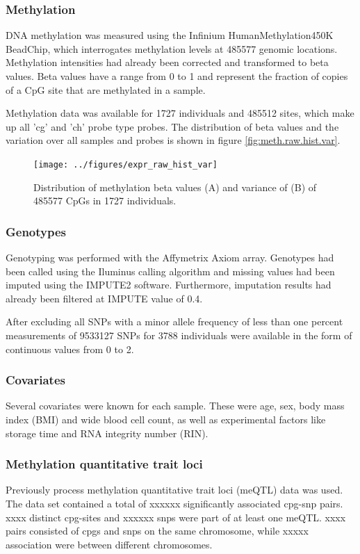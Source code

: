 \documentclass[a4paper,12pt]{article}
\begin{document}
\subsubsection{Methylation}
DNA methylation was measured using the Infinium HumanMethylation450K BeadChip, which interrogates methylation levels at 485577 genomic locations. Methylation intensities had already been corrected and transformed to beta values. Beta values have a range from 0 to 1 and represent the fraction of copies of a CpG site that are methylated in a sample.

Methylation data was available for 1727 individuals and 485512 sites, which make up all 'cg' and 'ch' probe type probes. The distribution of beta values and the variation over all samples and probes is shown in figure \ref{fig:meth.raw.hist.var}.

\begin{figure}[tb]
	\texttt{[image: ../figures/expr\_raw\_hist\_var]}  
	\caption{Distribution of methylation beta values (A) and variance of (B) of 485577 CpGs in 1727 individuals.}
    \label{fig:expr.raw.hist.cov}
\end{figure}

 
\subsubsection{Genotypes}
Genotyping was performed with the Affymetrix Axiom array. Genotypes had been called using the Iluminus calling algorithm and missing values had been imputed using the IMPUTE2 software\cite{10.1371/journal.pgen.1000529}. Furthermore, imputation results had already been filtered at IMPUTE value of 0.4. 

After excluding all SNPs with a minor allele frequency of less than one percent measurements of 9533127 SNPs for 3788 individuals were available in the form of continuous values from 0 to 2.

\subsubsection{Covariates}
Several covariates were known for each sample. These were age, sex, body mass index (BMI) and wide blood cell count, as well as experimental factors like storage time and RNA integrity number (RIN).

\subsubsection{Methylation quantitative trait loci}
Previously process methylation quantitative trait loci (meQTL) data was used. The data set contained a total of xxxxxx significantly associated cpg-snp pairs. 
xxxx distinct cpg-sites and xxxxxx snps were part of at least one meQTL. xxxx pairs consisted of cpgs and snps on the same chromosome, while xxxxx association were between different chromosomes. 
\end{document}
